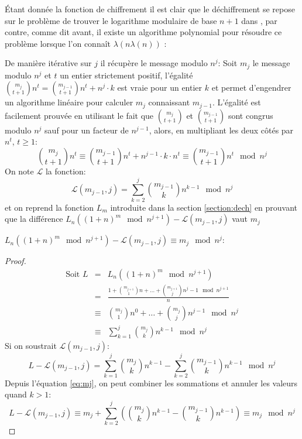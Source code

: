 	Étant donnée la fonction de chiffrement il est clair que le déchiffrement se repose sur le pro\-blè\-me de trouver le 
	logarithme modulaire de base $n+1$ dans , par contre, comme dit avant, il existe un algorithme polynomial
	pour résoudre ce problème lorsque l'on connaît $\lambda(n\lambda(n))$ :

	De manière itérative sur $j$ il récupère le message modulo $n^j$: Soit $m_j$ le message modulo $n^j$ et $t$ un entier strictement positif,
	l'égalité $\binom{m_{j}}{t+1}n^t = \binom{m_{j-1}}{t+1}n^t + n^j\cdot k$ est vraie pour un entier $k$ et permet d'engendrer un 
	algorithme linéaire pour calculer $m_j$ connaissant  $m_{j-1}$. L'égalité est facilement prouvée en utilisant le fait que 
	$\binom{m_j}{t+1}$ et  $\binom{m_{j-1}}{t+1}$ sont congrus modulo $n^{j}$ sauf pour un facteur de $n^{j-1}$, alors, en multipliant les deux 
	côtés par $n^t$, $t\geq1$:
		\begin{equation}
			\label{eq:mj} \binom{m_j}{t+1}n^t \equiv \binom{m_{j-1}}{t+1}n^t+n^{j-1}\cdot k\cdot n^t \equiv \binom{m_{j-1}}{t+1}n^t \mod{n^j} 
		\end{equation}
	On note $\mathcal{L}$ la fonction:$$\mathcal{L}(m_{j-1},j) = \sum_{k = 2}^{j}\binom{m_{j-1}}{k}n^{k-1} \mod n^j$$ 
	et on reprend la fonction $L_m$ introduite dans la section   \ref{section:dech} en prouvant que la différence 
	$L_{n}((1+n)^m\mod{n^{j+1}}) - \mathcal{L}(m_{j-1},j)$ vaut $m_j$

	\begin{lemma} $L_{n}((1+n)^m\mod{n^{j+1}}) - \mathcal{L}(m_{j-1},j) \equiv m_j \mod{n^j}$:
		\label{lemma:jurik}
		\begin{proof}
			\begin{eqnarray*}
				 \text{Soit }L &=& L_{n}((1+n)^m\mod{n^{j+1}}) \\
				     &=& \frac{1+\binom{m_{j+1}}{1}n +  \dots +\binom{m_{j+1}}{j}n^{j} -1  \mod{n^{j+1}}  }{n} \\
							 &\equiv& \binom{m_{j}}{1}n^0 + \dots +\binom{m_{j}}{j}n^{j-1} \mod{n^{j}}\\
							 &\equiv& \sum_{k=1}^{j}\binom{m_{j}}{k}n^{k-1} \mod{n^{j}}
			\end{eqnarray*}
			Si on soustrait $\mathcal{L}(m_{j-1},j)$:
			$$L-\mathcal{L}(m_{j-1},j)  = \sum_{k=1}^{j}\binom{m_{j}}{k}n^{k-1} - \sum_{k = 2}^{j}\binom{m_{j-1}}{k}n^{k-1} \mod n^j $$
			Depuis l'équation \ref{eq:mj}, on peut combiner les sommations et annuler les valeurs quand $k>1$:
			$$L-\mathcal{L}(m_{j-1},j) \equiv m_j + \sum_{k=2}^{j}\left(\binom{m_{j}}{k}n^{k-1}-\binom{m_{j-1}}{k}n^{k-1} \right) \equiv m_j \mod{n^j} $$
		\end{proof}
	\end{lemma}


